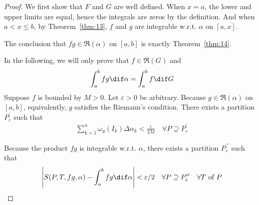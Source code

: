 \documentclass[thmcnt=section, color=blue, 12pt]{my-elegantbook}
\begin{document}
\begin{proof}
	We first show that $F$ and $G$ are well defined.
	When $x = a$, the lower and upper limits are equal,
	hence the integrals are zeros by the definition.
	And when $a < x \leq b$,
	by Theorem~\ref{thm:13}, $f$ and $g$ are integrable w.r.t. $\alpha$ on $[a, x]$.

	The conclusion that $fg \in \mathfrak{R}(\alpha)$ on $[a, b]$
	is exactly Theorem~\ref{thm:14}.

	In the following, we will only prove that $f \in \mathfrak{R}(G)$ and
	\begin{align*}
		\int_a^b f g \dif \alpha
		= \int_a^b f \dif G
	\end{align*}
	Suppose $f$ is bounded by $M > 0$.
	Let $\varepsilon > 0$ be arbitrary.
	Because $g \in \mathfrak{R}(\alpha)$ on $[a, b]$,
	equivalently, $g$ satisfies the Riemann's condition.
	There exists a partition $P^\prime_\varepsilon$
	such that
	\begin{align}
		\sum_{k=1}^n \omega_g(I_k) \Delta \alpha_k < \frac{\varepsilon}{2M}
		\quad \forall P \supseteq P^\prime_\varepsilon
		\label{eq:55}
	\end{align}

	Because the product $fg$ is integrable w.r.t. $\alpha$,
	there exists a partition $P^{\prime\prime}_\varepsilon$
	such that
	\begin{align}
		\abs{S(P, T, fg, \alpha) - \int_a^b f g \dif \alpha} < \varepsilon / 2
		\quad \forall P \supseteq P^{\prime\prime}_\varepsilon \quad \forall T \text{ of } P
		\label{eq:56}
	\end{align}


\end{proof}
\end{document}
